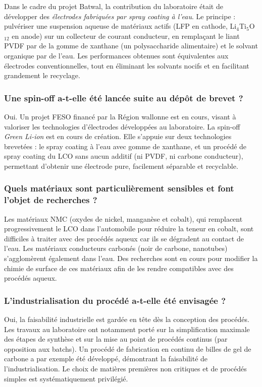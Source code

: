 Dans le cadre du projet Batwal, la contribution du laboratoire était de développer des \textit{électrodes fabriquées par spray coating à l'eau}. Le principe : pulvériser une suspension aqueuse de matériaux actifs (LFP en cathode, Li$_4$Ti$_5$O$_{12}$ en anode) sur un collecteur de courant conducteur, en remplaçant le liant PVDF par de la gomme de xanthane (un polysaccharide alimentaire) et le solvant organique par de l'eau. Les performances obtenues sont équivalentes aux électrodes conventionnelles, tout en éliminant les solvants nocifs et en facilitant grandement le recyclage.

\subsubsection{Une spin-off a-t-elle été lancée suite au dépôt de brevet ?}

Oui. Un projet FESO financé par la Région wallonne est en cours, visant à valoriser les technologies d'électrodes développées au laboratoire. La spin-off \textit{Green Li-ion} est en cours de création. Elle s'appuie sur deux technologies brevetées : le spray coating à l'eau avec gomme de xanthane, et un procédé de spray coating du LCO sans aucun additif (ni PVDF, ni carbone conducteur), permettant d'obtenir une électrode pure, facilement séparable et recyclable.

\subsubsection{Quels matériaux sont particulièrement sensibles et font l'objet de recherches ?}

Les matériaux NMC (oxydes de nickel, manganèse et cobalt), qui remplacent progressivement le LCO dans l'automobile pour réduire la teneur en cobalt, sont difficiles à traiter avec des procédés aqueux car ils se dégradent au contact de l'eau. Les matériaux conducteurs carbonés (noir de carbone, nanotubes) s'agglomèrent également dans l'eau. Des recherches sont en cours pour modifier la chimie de surface de ces matériaux afin de les rendre compatibles avec des procédés aqueux.

\subsubsection{L'industrialisation du procédé a-t-elle été envisagée ?}

Oui, la faisabilité industrielle est gardée en tête dès la conception des procédés. Les travaux au laboratoire ont notamment porté sur la simplification maximale des étapes de synthèse et sur la mise au point de procédés continus (par opposition aux batchs). Un procédé de fabrication en continu de billes de gel de carbone a par exemple été développé, démontrant la faisabilité de l'industrialisation. Le choix de matières premières non critiques et de procédés simples est systématiquement privilégié.

